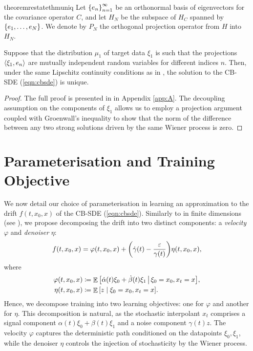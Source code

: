 \begin{theorembox}
  \begin{restatable}{theorem}{restatethmuniq}\label{thm:uniq}
    Let \(\qty{e_{n}}_{n=1}^{\infty}\) be an orthonormal basis of eigenvectors for the covariance operator \(C\), and let \(H_{N}\) be the subspace of \(H_{C}\) spanned by \(\qty{e_{1}, \ldots, e_{N}}\). We denote by \(P_{N}\) the orthogonal projection operator from \(H\) into \(H_{N}\).

    Suppose that the distribution \(\mu_{1}\) of target data \(\xi_{1}\) is such that the projections \(\ev{\xi_{1}, e_{n}}\) are mutually independent random variables for different indices \(n\). Then, under the same Lipschitz continuity conditions as in , the solution to the CB-SDE (\ref{eqn:cbsde}) is unique.
  \end{restatable}
\end{theorembox}%
\begin{proof}
  The full proof is presented in  in Appendix \ref{app:A}. The decoupling assumption on the components of \(\xi_{1}\) allows us to employ a projection argument coupled with Groenwall's inequality to show that the norm of the difference between any two strong solutions driven by the same Wiener process is zero.
\end{proof}


\section{Parameterisation and Training Objective}
We now detail our choice of parameterisation in learning an approximation to the drift \(f(t,x_{0}, x)\)  of the CB-SDE (\ref{eqn:cbsde}). Similarly to in finite dimensions (see \citealp[Section 2.4]{albergo2023stochasticinterpolantsunifyingframework}), we propose decomposing the drift into two distinct components: a \textit{velocity} \(\varphi\) and \textit{denoiser} \(\eta\):
\begin{equation}
  f(t, x_{0}, x) = \varphi(t, x_{0}, x) + \qty(\dot{\gamma}(t) - \frac{\varepsilon}{\gamma(t)}) \eta(t,  x_{0}, x), \label{eqn:driftgoodparam}
\end{equation}
where
\begin{align*}
  \varphi(t, x_{0}, x) &\coloneqq \mathop{\mathbb{E}}\qty[\dot{\alpha}(t) \xi_{0} + \dot{\beta}(t)\xi_{1} \,\big|\, \xi_{0} = x_{0}, x_{t} = x], \\
  \eta(t, x_{0}, x) &\coloneqq \mathop{\mathbb{E}}\qty[z \mid \xi_{0} = x_{0}, x_{t} = x].
\end{align*}
Hence, we decompose training into two learning objectives: one for \(\varphi\) and another for \(\eta\). This decomposition is natural, as the stochastic interpolant \(x_{t}\) comprises a  signal component \(\alpha(t) \xi_{0} + \beta(t) \xi_{1}\) and a noise component \(\gamma(t) z\). The velocity \(\varphi\) captures the deterministic path conditioned on the datapoints \(\xi_{0}, \xi_{1}\), while the denoiser \(\eta\) controls the injection of stochasticity by the Wiener process. %

